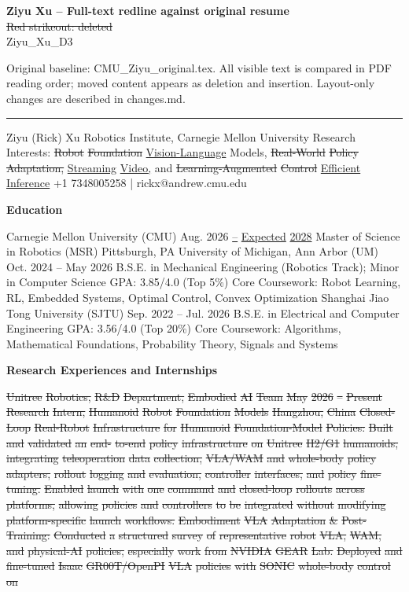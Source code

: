\documentclass[10pt,letterpaper]{article}
\newcommand{\del}[1]{{\color{red}\sout{#1}}}
\newcommand{\add}[1]{{\color{blue}\uline{#1}}}
\begin{document}
\textbf{Ziyu Xu -- Full-text redline against original resume}\\
\del{Red strikeout: deleted} \quad \add{Blue underline: added}\\
Ziyu\_Xu\_D3\par
Original baseline: CMU\_Ziyu\_original.tex. All visible text is compared in PDF reading order; moved content appears as deletion and insertion. Layout-only changes are described in changes.md.
\hrule\medskip
Ziyu (Rick) Xu Robotics Institute, Carnegie Mellon University Research Interests: \del{Robot} \del{Foundation} \add{Vision-Language} Models, \del{Real-World} \del{Policy} \del{Adaptation,} \add{Streaming} \add{Video,} and \del{Learning-Augmented} \del{Control} \add{Efficient} \add{Inference} +1 7348005258 | rickx@andrew.cmu.edu \par\medskip\textbf{Education}\par  Carnegie Mellon University (CMU) Aug. 2026 \add{--} \add{Expected} \add{2028} Master of Science in Robotics (MSR) Pittsburgh, PA University of Michigan, Ann Arbor (UM) Oct. 2024 -- May 2026 B.S.E. in Mechanical Engineering (Robotics Track); Minor in Computer Science GPA: 3.85/4.0 (Top 5\%)  Core Coursework: Robot Learning, RL, Embedded Systems, Optimal Control, Convex Optimization Shanghai Jiao Tong University (SJTU) Sep. 2022 -- Jul. 2026 B.S.E. in Electrical and Computer Engineering GPA: 3.56/4.0 (Top 20\%)  Core Coursework: Algorithms, Mathematical Foundations, Probability Theory, Signals and Systems \par\medskip\textbf{Research Experiences and Internships}\par  \del{Unitree} \del{Robotics,} \del{R\&D} \del{Department,} \del{Embodied} \del{AI} \del{Team} \del{May} \del{2026} \del{--} \del{Present} \del{Research} \del{Intern,} \del{Humanoid} \del{Robot} \del{Foundation} \del{Models} \del{Hangzhou,} \del{China} \del{} \del{Closed-Loop} \del{Real-Robot} \del{Infrastructure} \del{for} \del{Humanoid} \del{Foundation-Model} \del{Policies:} \del{Built} \del{and} \del{validated} \del{an} \del{end-} \del{to-end} \del{policy} \del{infrastructure} \del{on} \del{Unitree} \del{H2/G1} \del{humanoids,} \del{integrating} \del{teleoperation} \del{data} \del{collection,} \del{VLA/WAM} \del{and} \del{whole-body} \del{policy} \del{adapters,} \del{rollout} \del{logging} \del{and} \del{evaluation,} \del{controller} \del{interfaces,} \del{and} \del{policy} \del{fine-tuning.} \del{Enabled} \del{launch} \del{with} \del{one} \del{command} \del{and} \del{closed-loop} \del{rollouts} \del{across} \del{platforms,} \del{allowing} \del{policies} \del{and} \del{controllers} \del{to} \del{be} \del{integrated} \del{without} \del{modifying} \del{platform-specific} \del{launch} \del{workflows.} \del{} \del{Embodiment} \del{VLA} \del{Adaptation} \del{\&} \del{Post-Training:} \del{Conducted} \del{a} \del{structured} \del{survey} \del{of} \del{representative} \del{robot} \del{VLA,} \del{WAM,} \del{and} \del{physical-AI} \del{policies,} \del{especially} \del{work} \del{from} \del{NVIDIA} \del{GEAR} \del{Lab.} \del{Deployed} \del{and} \del{fine-tuned} \del{Isaac} \del{GR00T/OpenPI} \del{VLA} \del{policies} \del{with} \del{SONIC} \del{whole-body} \del{control} \del{on} 
\end{document}

